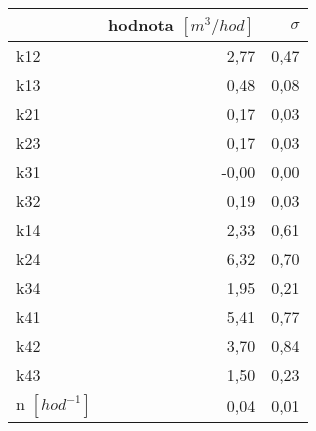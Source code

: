 \begin{tabular}{lrr}
\toprule
{} &  hodnota $\left[\si{m^3/hod}\right]$ &  $\sigma$ \\
\midrule
k12                 &                                 2,77 &      0,47 \\
k13                 &                                 0,48 &      0,08 \\
k21                 &                                 0,17 &      0,03 \\
k23                 &                                 0,17 &      0,03 \\
k31                 &                                -0,00 &      0,00 \\
k32                 &                                 0,19 &      0,03 \\
k14                 &                                 2,33 &      0,61 \\
k24                 &                                 6,32 &      0,70 \\
k34                 &                                 1,95 &      0,21 \\
k41                 &                                 5,41 &      0,77 \\
k42                 &                                 3,70 &      0,84 \\
k43                 &                                 1,50 &      0,23 \\
n $[\si{hod^{-1}}]$ &                                 0,04 &      0,01 \\
\bottomrule
\end{tabular}
